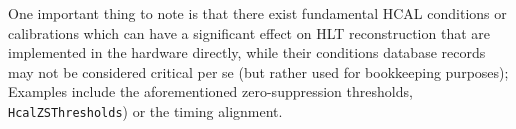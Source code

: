 One important thing to note is that there exist fundamental HCAL conditions or calibrations which can have a significant effect on HLT reconstruction that are implemented in the hardware directly,  while their conditions database records may not be considered critical per se (but rather used for bookkeeping purposes); Examples include the aforementioned zero-suppression thresholds, \texttt{HcalZSThresholds}) or the timing alignment.


